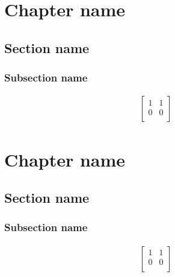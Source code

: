 \documentclass[12pt, fleqn]{book}
\begin{document}
\chapter{Chapter name }

\section{Section name}

\subsection{Subsection name}

\begin{align*}
	\begin{bmatrix}
		1 & 1 \\
		0 & 0 \\
	\end{bmatrix}
\end{align*}






\chapter{Chapter name }

\section{Section name}

\subsection{Subsection name}

\begin{align*}
	\begin{bmatrix}
		1 & 1 \\
		0 & 0 \\
	\end{bmatrix}
\end{align*}
\end{document}
